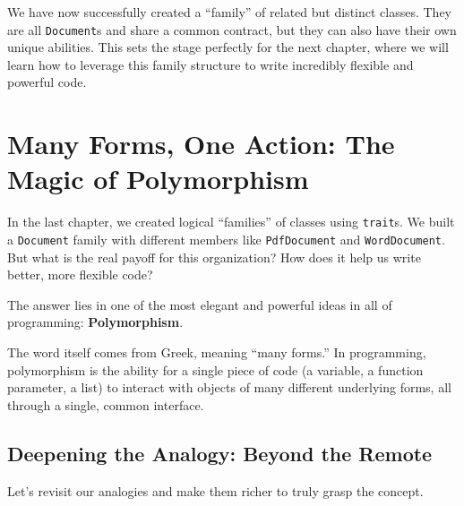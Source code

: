 \documentclass[
  letterpaper,
  DIV=11,
  numbers=noendperiod]{scrreprt}
\begin{document}
We have now successfully created a ``family'' of related but distinct
classes. They are all \texttt{Document}s and share a common contract,
but they can also have their own unique abilities. This sets the stage
perfectly for the next chapter, where we will learn how to leverage this
family structure to write incredibly flexible and powerful code.


\chapter{Many Forms, One Action: The Magic of
Polymorphism}\label{many-forms-one-action-the-magic-of-polymorphism}

In the last chapter, we created logical ``families'' of classes using
\texttt{trait}s. We built a \texttt{Document} family with different
members like \texttt{PdfDocument} and \texttt{WordDocument}. But what is
the real payoff for this organization? How does it help us write better,
more flexible code?

The answer lies in one of the most elegant and powerful ideas in all of
programming: \textbf{Polymorphism}.

The word itself comes from Greek, meaning ``many forms.'' In
programming, polymorphism is the ability for a single piece of code (a
variable, a function parameter, a list) to interact with objects of many
different underlying forms, all through a single, common interface.

\section{Deepening the Analogy: Beyond the
Remote}\label{deepening-the-analogy-beyond-the-remote}

Let's revisit our analogies and make them richer to truly grasp the
concept.
\end{document}
